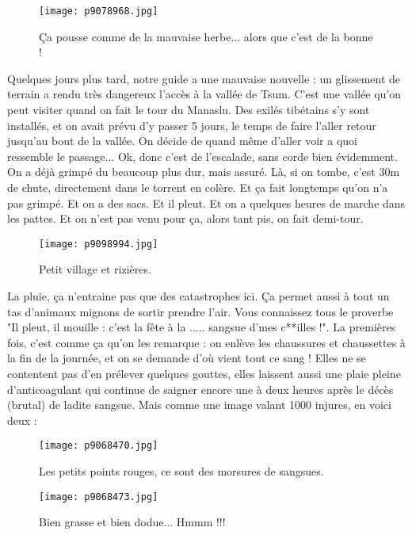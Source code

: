 \documentclass{book}
\begin{document}
\begin{figure}[h]
\centering
\texttt{[image: p9078968.jpg]}
\caption*{Ça pousse comme de la mauvaise herbe... alors que c'est de la bonne !}
\end{figure}

Quelques jours plus tard, notre guide a une mauvaise nouvelle : un glissement de terrain a rendu très dangereux l'accès à la vallée de Tsum. C'est une vallée qu'on peut visiter quand on fait le tour du Manaslu. Des exilés tibétains s'y sont installés, et on avait prévu d'y passer 5 jours, le temps de faire l'aller retour jusqu'au bout de la vallée. On décide de quand même d'aller voir a quoi ressemble le passage... Ok, donc c'est de l'escalade, sans corde bien évidemment. On a déjà grimpé du beaucoup plus dur, mais assuré. Là, si on tombe, c'est 30m de chute, directement dans le torrent en colère. Et ça fait longtemps qu'on n'a pas grimpé. Et on a des sacs. Et il pleut. Et on a quelques heures de marche dans les pattes. Et on n'est pas venu pour ça, alors tant pis, on fait demi-tour.


\begin{figure}[h]
\centering
\texttt{[image: p9098994.jpg]}
\caption*{Petit village et rizières.}
\end{figure}

La pluie, ça n'entraine pas que des catastrophes ici. Ça permet aussi à tout un tas d'animaux mignons de sortir prendre l'air. Vous connaissez tous le proverbe "Il pleut, il mouille : c'est la fête à la .....  sangsue d'mes c**illes !". La premières fois, c'est comme ça qu'on les remarque : on enlève les chaussures et chaussettes à la fin de la journée, et on se demande d'où vient tout ce sang ! Elles ne se contentent pas d'en prélever quelques gouttes, elles laissent aussi une plaie pleine d'anticoagulant qui continue de saigner encore une à deux heures après le décès (brutal) de ladite sangsue. Mais comme une image valant 1000 injures, en voici deux :


\begin{figure}[h]
\centering
\texttt{[image: p9068470.jpg]}
\caption*{Les petits points rouges, ce sont des morsures de sangsues.}
\end{figure}


\begin{figure}[h]
\centering
\texttt{[image: p9068473.jpg]}
\caption*{Bien grasse et bien dodue... Hmmm !!!}
\end{figure}
\end{document}
